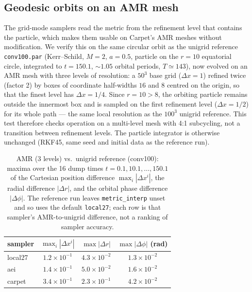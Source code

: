 \documentclass[11pt]{article}
\begin{document}
\subsection{Geodesic orbits on an AMR mesh}\label{sec:amr-orbits}

The grid-mode samplers read the metric from the refinement level that
contains the particle, which makes them usable on Carpet's AMR meshes
without modification.  We verify this on the same circular orbit as the
unigrid reference \texttt{conv100.par} (Kerr--Schild, $M=2$, $a=0.5$,
particle on the $r=10$ equatorial circle, integrated to $t=150.1$,
$\sim 1.05$ orbital periods, $T\simeq 143$), now evolved on an AMR mesh
with three levels of resolution: a $50^3$ base grid ($\Delta x=1$)
refined twice (factor 2) by boxes of coordinate half-widths $16$ and $8$
centred on the origin, so that the finest level has $\Delta x=1/4$.  Since
$r=10>8$, the orbiting particle remains outside the innermost box and is
sampled on the first refinement level ($\Delta x=1/2$) for its whole path
--- the same local resolution as the $100^3$ unigrid reference.  This test
therefore checks operation on a multi-level mesh with 4:1 subcycling, not
a transition between refinement levels.  The particle integrator is
otherwise unchanged (RKF45, same seed and initial data as the reference
run).

\begin{table}[h]
\centering
\caption{AMR (3 levels) vs.\ unigrid reference (conv100): maxima over
the 16 dump times $t=0.1,10.1,\ldots,150.1$ of the Cartesian position
difference $\max_i|\Delta x^i|$, the radial difference $|\Delta r|$, and
the orbital phase difference $|\Delta\phi|$.  The reference run leaves
\texttt{metric\_interp} unset and so uses the default \texttt{local27};
each row is that sampler's AMR-to-unigrid difference, not a ranking of
sampler accuracy.}\label{tab:amr-orbits}
\begin{tabular}{lccc}
\toprule
sampler & $\max_i|\Delta x^i|$ & $\max|\Delta r|$ & $\max|\Delta\phi|$ (rad) \\
\midrule
local27           & $1.2\times10^{-1}$ & $4.3\times10^{-2}$ & $1.3\times10^{-2}$ \\
aei               & $1.4\times10^{-1}$ & $5.0\times10^{-2}$ & $1.6\times10^{-2}$ \\
carpet            & $3.4\times10^{-1}$ & $2.3\times10^{-1}$ & $4.2\times10^{-2}$ \\
\bottomrule
\end{tabular}
\end{table}
\end{document}
